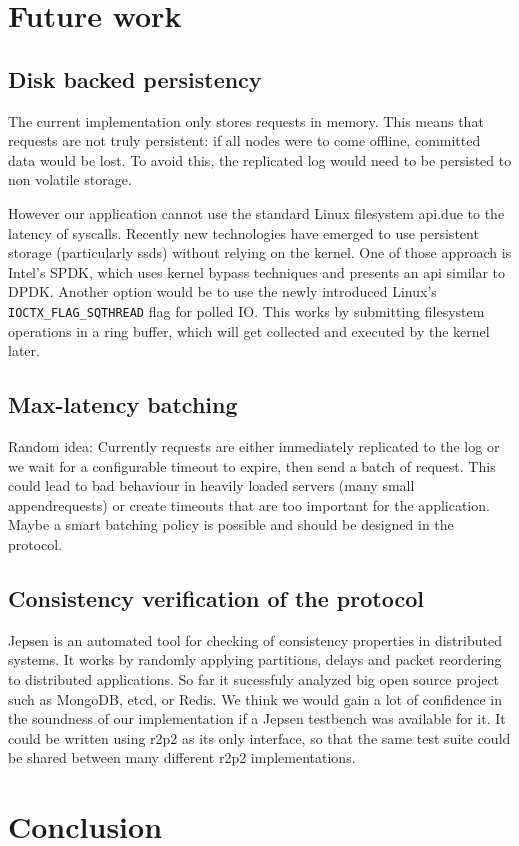 \chapter{Future work}

\section{Disk backed persistency}

The current implementation only stores requests in memory.
This means that requests are not truly persistent: if all nodes were to come offline, committed data would be lost.
To avoid this, the replicated log would need to be persisted to non volatile storage.

However our application cannot use the standard Linux filesystem \gls{api}.due to the latency of syscalls.
Recently new technologies have emerged to use persistent storage (particularly \glspl{ssd}) without relying on the kernel.
One of those approach is Intel's SPDK\cite{spdk}, which uses kernel bypass techniques and presents an \gls{api} similar to DPDK.
Another option would be to use the newly introduced Linux's \texttt{IOCTX\_FLAG\_SQTHREAD} flag for polled IO.
This works by submitting filesystem operations in a ring buffer, which will get collected and executed by the kernel later.

\section{Max-latency batching}

Random idea: Currently requests are either immediately replicated to the log or we wait for a configurable timeout to expire, then send a batch of request.
This could lead to bad behaviour in heavily loaded servers (many small appendrequests) or create timeouts that are too important for the application.
Maybe a smart batching policy is possible and should be designed in the protocol.

\section{Consistency verification of the protocol}

Jepsen\cite{jepsen} is an automated tool for checking of consistency properties in distributed systems.
It works by randomly applying partitions, delays and packet reordering to distributed applications.
So far it sucessfuly analyzed big open source project such as MongoDB, etcd, or Redis.
We think we would gain a lot of confidence in the soundness of our implementation if a Jepsen testbench was available for it.
It could be written using \gls{r2p2} as its only interface, so that the same test suite could be shared between many different \gls{r2p2} implementations.

\chapter{Conclusion}


